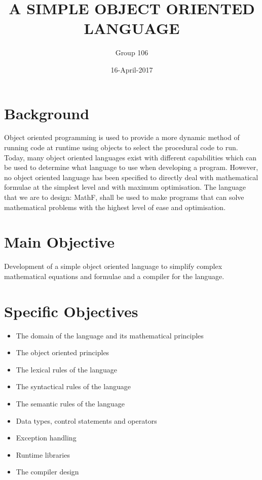 \documentclass{article}
\begin{document}
\title{A SIMPLE OBJECT ORIENTED LANGUAGE}
\date{16-April-2017}

\author{Group 106}


\maketitle
\newpage

\section{Background}
\cite{key:1}Object oriented programming is used to provide a more dynamic method of running code at runtime using objects to select the procedural code to run. Today, many object oriented languages exist with different capabilities which can be used to determine what language to use when developing a program. However, no object oriented language has been specified to directly deal with mathematical formulae at the simplest level and with maximum optimisation. The language that we are to design: MathF, shall be used to make programs that can solve mathematical problems with the highest level of ease and optimisation.

\section{Main Objective}
Development of a simple object oriented language to simplify complex mathematical equations and formulae and a compiler for the language.

\section{Specific Objectives}
\begin{itemize}
\item
The domain of the language and its mathematical principles
\item
The object oriented principles
\item
The lexical rules of the language
\item
The syntactical rules of the language
\item
The semantic rules of the language
\item
Data types, control statements and operators
\item
Exception handling
\item
Runtime libraries
\item
The compiler design
\end{itemize}
\end{document}
